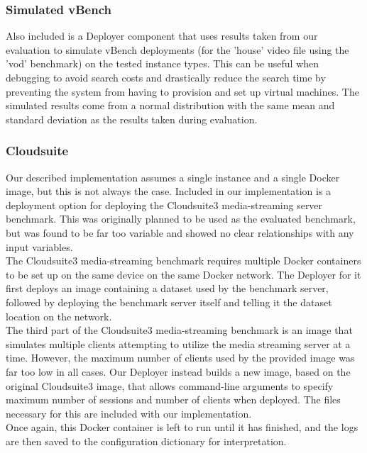 \documentclass{report}
\begin{document}
\subsubsection{Simulated vBench}
Also included is a Deployer component that uses results taken from our evaluation to simulate vBench deployments (for the 'house' video file using the 'vod' benchmark) on the tested instance types. This can be useful when debugging to avoid search costs and drastically reduce the search time by preventing the system from having to provision and set up virtual machines. The simulated results come from a normal distribution with the same mean and standard deviation as the results taken during evaluation.

\subsubsection{Cloudsuite}
Our described implementation assumes a single instance and a single Docker image, but this is not always the case. Included in our implementation is a deployment option for deploying the Cloudsuite3\cite{Palit2016} media-streaming server benchmark. This was originally planned to be used as the evaluated benchmark, but was found to be far too variable and showed no clear relationships with any input variables. \\
The Cloudsuite3 media-streaming benchmark requires multiple Docker containers to be set up on the same device on the same Docker network. The Deployer for it first deploys an image containing a dataset used by the benchmark server, followed by deploying the benchmark server itself and telling it the dataset location on the network. \\
The third part of the Cloudsuite3 media-streaming benchmark is an image that simulates multiple clients attempting to utilize the media streaming server at a time. However, the maximum number of clients used by the provided image was far too low in all cases. Our Deployer instead builds a new image, based on the original Cloudsuite3 image, that allows command-line arguments to specify maximum number of sessions and number of clients when deployed. The files necessary for this are included with our implementation.\\
Once again, this Docker container is left to run until it has finished, and the logs are then saved to the configuration dictionary for interpretation.
 
\end{document}
